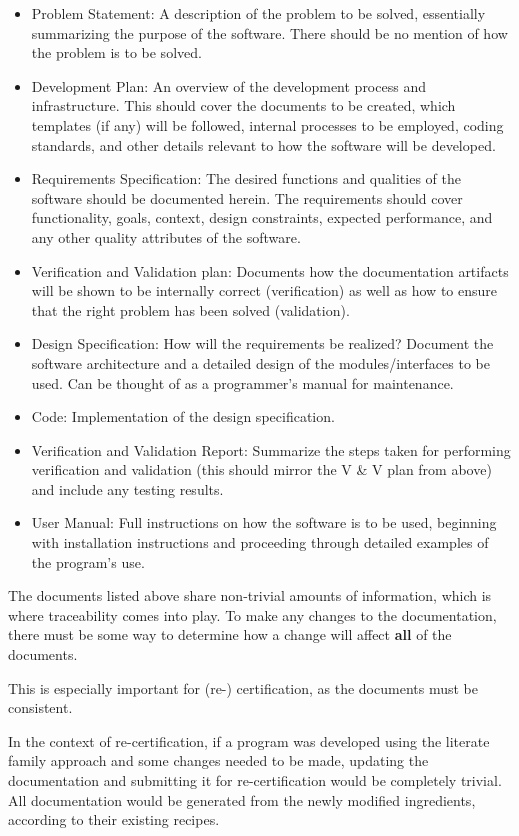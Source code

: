 \documentclass[10pt, preprint]{sigplanconf}
\begin{document}
\begin{itemize}
\item Problem Statement: A description of the problem to be solved, essentially
  summarizing the purpose of the software. There should be no mention of how the
  problem is to be solved.
\item Development Plan: An overview of the development process and
  infrastructure. This should cover the documents to be created, which templates
  (if any) will be followed, internal processes to be employed, coding
  standards, and other details relevant to how the software will be developed.
\item Requirements Specification: The desired functions and qualities of the
  software should be documented herein. The requirements should cover
  functionality, goals, context, design constraints, expected performance, and
  any other quality attributes of the software.
\item Verification and Validation plan: Documents how the documentation
  artifacts will be shown to be internally correct (verification) as well as how
  to ensure that the right problem has been solved (validation).
\item Design Specification: How will the requirements be realized? Document the
  software architecture and a detailed design of the modules/interfaces to be
  used. Can be thought of as a programmer's manual for maintenance.
\item Code: Implementation of the design specification.
\item Verification and Validation Report: Summarize the steps taken for
  performing verification and validation (this should mirror the V \& V plan
  from above) and include any testing results.
\item User Manual: Full instructions on how the software is to be used,
  beginning with installation instructions and proceeding through detailed
  examples of the program's use.
\end{itemize}

The documents listed above share non-trivial amounts of information, which is
where traceability comes into play. To make any changes to the
documentation, there must be some way to determine how a change will affect
\textbf{all} of the documents.

This is especially important for (re-) certification, as the documents must be 
consistent.

In the context of re-certification, if a program was developed using the literate 
family approach and some changes needed to be made, updating the 
documentation and submitting it for re-certification would be completely trivial. 
All documentation would be generated from the newly modified ingredients, 
according to their existing recipes.
\end{document}
